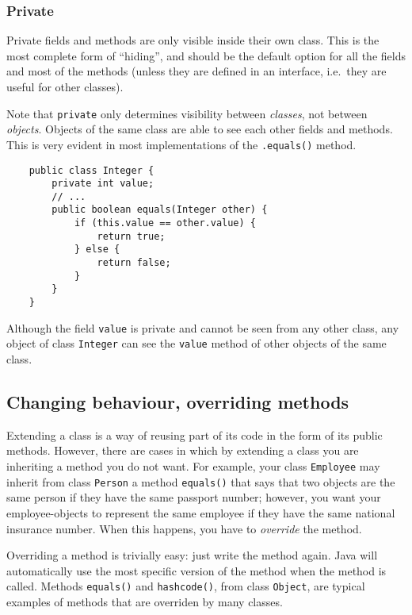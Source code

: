 \subsubsection{Private}
\label{sec:private}

Private fields and methods are only visible inside their own class. This
is the most complete form of ``hiding'', and should be the default
option for all the fields and most of the methods (unless they are
defined in an interface, i.e.~they are useful for other classes). 

Note that \verb+private+ only determines visibility between \emph{classes},
not between \emph{objects}. Objects of the same class are able to see each
other fields and methods. This is very evident in most implementations
of the \verb+.equals()+ method. 

\begin{verbatim}
    public class Integer {
        private int value;
        // ...
        public boolean equals(Integer other) {
            if (this.value == other.value) {
                return true;
            } else {
                return false;
            }
        }
    }
\end{verbatim}

Although the field \verb+value+ is private and cannot be seen from any
other class, any object of class \verb+Integer+ can see the
\verb+value+ method of other objects of the same class. 

\subsection{Changing behaviour, overriding methods}
\label{sec:chang-overr-behav}

Extending a class is a way of reusing part of its code in the form of
its public methods. However, there are cases in which by extending a
class you are inheriting a method you do not want. For example, your
class \verb+Employee+ may inherit from class \verb+Person+ a method
\verb+equals()+ that says that two objects are the same person if they
have the same passport number; however, you want your employee-objects
to represent the same employee if they have the same national
insurance number. When this happens, you have to \emph{override} the
method. 

Overriding a method is trivially easy: just write the method
again. Java will automatically use the most specific version of the
method when the method is called. Methods \verb+equals()+ and
\verb+hashcode()+, from class \verb+Object+, are typical examples of
methods that are overriden by many classes. 

